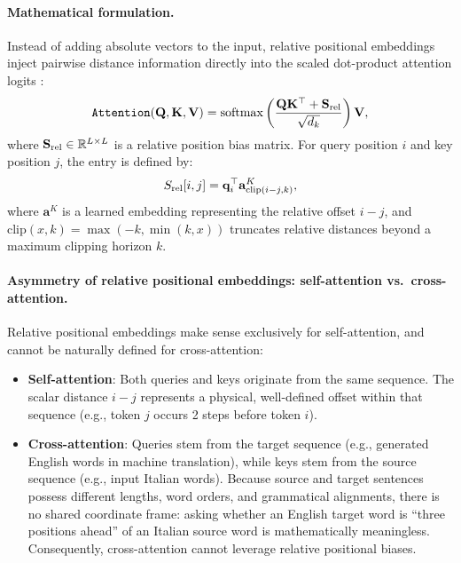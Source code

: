 \documentclass[../../main.tex]{subfiles}
\begin{document}
\paragraph{Mathematical formulation.}
Instead of adding absolute vectors to the input, relative positional embeddings inject pairwise distance information directly into the scaled dot-product attention logits :
\begin{equation}
\label{eq:relative_position_attention}
\text{\texttt{Attention}}(\mathbf{Q}, \mathbf{K}, \mathbf{V}) = \operatorname{\mathrm{softmax}}\left( \frac{\mathbf{Q} \mathbf{K}^\top + \mathbf{S}_{\text{rel}}}{\sqrt{d_k}} \right) \mathbf{V},
\end{equation}
where $\mathbf{S}_{\text{rel}} \in \mathbb{R}^{L \times L}$ is a relative position bias matrix. For query position $i$ and key position $j$, the entry is defined by:
\begin{equation}
S_{\text{rel}}[i, j] = \mathbf{q}_i^\top \mathbf{a}_{\text{clip}(i - j, k)}^K,
\end{equation}
where $\mathbf{a}^K$ is a learned embedding representing the relative offset $i - j$, and $\text{clip}(x, k) = \max(-k, \min(k, x))$ truncates relative distances beyond a maximum clipping horizon $k$.

\paragraph{Asymmetry of relative positional embeddings: self-attention vs.~cross-attention.}
Relative positional embeddings make sense exclusively for self-attention, and cannot be naturally defined for cross-attention:
\begin{itemize}
    \item \textbf{Self-attention}: Both queries and keys originate from the same sequence. The scalar distance $i - j$ represents a physical, well-defined offset within that sequence (e.g., token $j$ occurs 2 steps before token $i$).
    \item \textbf{Cross-attention}: Queries stem from the target sequence (e.g., generated English words in machine translation), while keys stem from the source sequence (e.g., input Italian words). Because source and target sentences possess different lengths, word orders, and grammatical alignments, there is no shared coordinate frame: asking whether an English target word is ``three positions ahead'' of an Italian source word is mathematically meaningless. Consequently, cross-attention cannot leverage relative positional biases.
\end{itemize}
\end{document}
